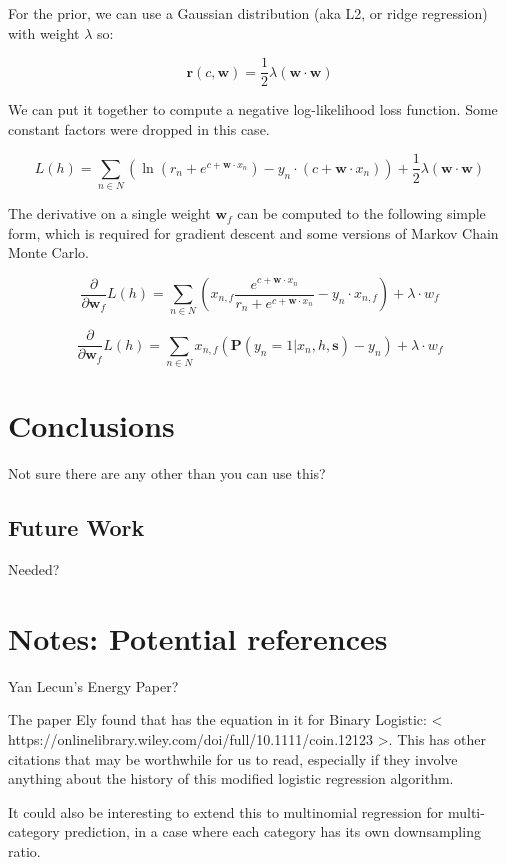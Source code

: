\documentclass[twoside]{article}
\begin{document}
For the prior, we can use a Gaussian distribution (aka L2, or ridge regression) with weight \(\lambda\) so:

\[\mathbf{r}(c,\mathbf{w})=\frac{1}{2}\lambda(\mathbf{w} \cdot \mathbf{w})\]

We can put it together to compute a negative log-likelihood loss function. Some constant factors were dropped in this case.

\[L(h)=\sum_{n \in  N} \left (\ln\left (r_n+e^{c+\mathbf{w} \cdot x_n}\right ) -y_n \cdot (c+\mathbf{w} \cdot x_n) \right )+ \frac{1}{2}\lambda(\mathbf{w} \cdot \mathbf{w})\]

The derivative on a single weight \(\mathbf{w}_f\) can be computed to the following simple form, which is required for gradient descent and some versions of Markov Chain Monte Carlo.

\[\frac{\partial}{\partial \mathbf{w}_f }L(h)=\sum_{n \in  N} \left(x_{n,f}\frac{e^{c+\mathbf{w} \cdot x_n}}{r_n+e^{c+\mathbf{w} \cdot x_n}} -y_n \cdot x_{n,f} \right )+ \lambda \cdot w_f\] 

\[\frac{\partial}{\partial \mathbf{w}_f }L(h)= \sum_{n \in  N} x_{n,f}\left(\mathbf{P}(y_n=1|x_n,h,\mathbf{s}) -y_n  \right )+ \lambda \cdot w_f \]

\section{Conclusions}

Not sure there are any other than you can use this?

\subsection{Future Work}

Needed?

\section{Notes: Potential references}

Yan Lecun’s Energy Paper?

The paper Ely found that has the equation in it for Binary Logistic: < https://onlinelibrary.wiley.com/doi/full/10.1111/coin.12123 >. This has other citations that may be worthwhile for us to read, especially if they involve anything about the history of this modified logistic regression algorithm.

It could also be interesting to extend this to multinomial regression for multi-category prediction, in a case where each category has its own downsampling ratio.
\end{document}
